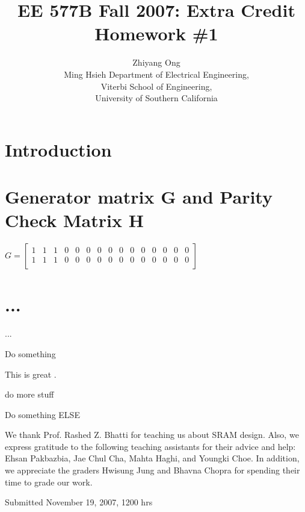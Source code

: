 \documentclass[ee577b,acmnow]{acmtrans2m}
\title{EE 577B Fall 2007: Extra Credit Homework \#1}
\author{Zhiyang Ong\\
Ming Hsieh Department of Electrical Engineering,\\
Viterbi School of Engineering,\\
University of Southern California
}
\begin{document}
\setcounter{page}{1}
            
            
\maketitle

\section{Introduction}

\section{Generator matrix G and Parity Check Matrix H}

$G = \left [ \begin{array}{ccccccccccccccc}
1 & 1 & 1 & 0 & 0 & 0 & 0 & 0 & 0 & 0 & 0 & 0 & 0 & 0 & 0 \\
1 & 1 & 1 & 0 & 0 & 0 & 0 & 0 & 0 & 0 & 0 & 0 & 0 & 0 & 0 \\
\end{array} \right ] $

\section{...}
...


\newpage
Do something

This is great \cite{Weste05,Rabaey03,Kang03,Sutherland99}.

\newpage
do more stuff

\newpage
Do something ELSE

\begin{acks}
We thank Prof. Rashed Z. Bhatti for teaching us about SRAM design.
 Also, we express gratitude to the following teaching assistants for
 their advice and help: Ehsan Pakbazbia, Jae Chul Cha, Mahta Haghi,
 and Youngki Choe. In addition, we appreciate the graders Hwisung
 Jung and Bhavna Chopra for spending their time to grade our work.
\end{acks}

%
%


\begin{received}
Submitted November 19, 2007, 1200 hrs
\end{received}
\end{document}
